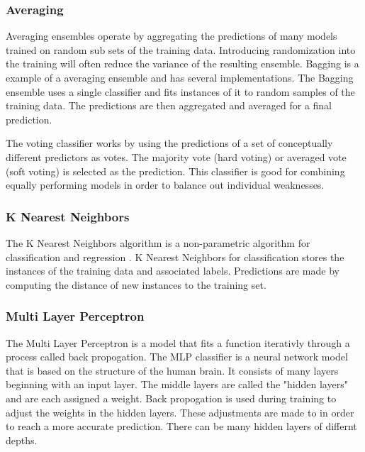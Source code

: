 \subsubsection{Averaging}
Averaging ensembles operate by aggregating the predictions of many models trained on random sub sets of the training data.
Introducing randomization into the training will often reduce the variance of the resulting ensemble.
Bagging is a example of a averaging ensemble and has several implementations.
The Bagging ensemble uses a single classifier and fits instances of it to random samples of the training data.
The predictions are then aggregated and averaged for a final prediction.

The voting classifier works by using the predictions of a set of conceptually different predictors as votes.
The majority vote (hard voting) or averaged vote (soft voting) is selected as the prediction.
This classifier is good for combining equally performing models in order to balance out individual weaknesses.

\subsubsection{K Nearest Neighbors}
The K Nearest Neighbors algorithm is a non-parametric algorithm for classification and regression \cite{altman1992introduction}.
K Nearest Neighbors for classification stores the instances of the training data and associated labels.
Predictions are made by computing the distance of new instances to the training set.

\subsubsection{Multi Layer Perceptron}
The Multi Layer Perceptron is a model that fits a function iterativly through a process called back propogation.
The MLP classifier is a neural network model that is based on the structure of the human brain.
It consists of many layers beginning with an input layer.
The middle layers are called the "hidden layers" and are each assigned a weight.
Back propogation is used during training to adjust the weights in the hidden layers.
These adjustments are made to in order to reach a more accurate prediction.
There can be many hidden layers of differnt depths.

